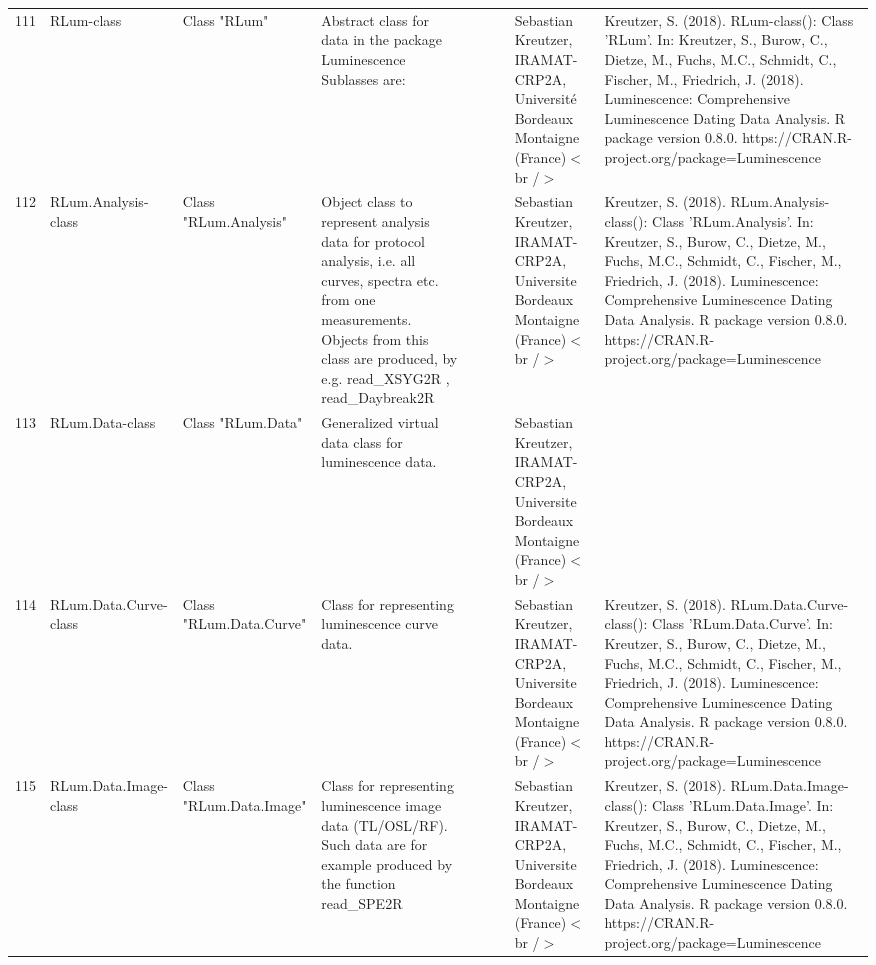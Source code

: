 \begin{table}[ht]
\begin{tabular}{rllllllll}
 \\ 
  111 & RLum-class & Class  "RLum" & Abstract class for data in the package Luminescence Sublasses are: &  &  &  & Sebastian Kreutzer, IRAMAT-CRP2A, Université Bordeaux Montaigne (France)$<$br /$>$ & Kreutzer, S. (2018). RLum-class(): Class 'RLum'. In: Kreutzer, S., Burow, C., Dietze, M., Fuchs, M.C., Schmidt, C., Fischer, M., Friedrich, J. (2018). Luminescence: Comprehensive Luminescence Dating Data Analysis. R package version 0.8.0. https://CRAN.R-project.org/package=Luminescence
 \\ 
  112 & RLum.Analysis-class & Class  "RLum.Analysis" & Object class to represent analysis data for protocol analysis, i.e. all curves, spectra etc. from one measurements. Objects from this class are produced, by e.g.  read\_XSYG2R ,  read\_Daybreak2R &  &  &  & Sebastian Kreutzer, IRAMAT-CRP2A, Universite Bordeaux Montaigne (France)$<$br /$>$ & Kreutzer, S. (2018). RLum.Analysis-class(): Class 'RLum.Analysis'. In: Kreutzer, S., Burow, C., Dietze, M., Fuchs, M.C., Schmidt, C., Fischer, M., Friedrich, J. (2018). Luminescence: Comprehensive Luminescence Dating Data Analysis. R package version 0.8.0. https://CRAN.R-project.org/package=Luminescence
 \\ 
  113 & RLum.Data-class & Class  "RLum.Data" & Generalized virtual data class for luminescence data. &  &  &  & Sebastian Kreutzer, IRAMAT-CRP2A, Universite Bordeaux Montaigne (France)$<$br /$>$ &  \\ 
  114 & RLum.Data.Curve-class & Class  "RLum.Data.Curve" & Class for representing luminescence curve data. &  &  &  & Sebastian Kreutzer, IRAMAT-CRP2A, Universite Bordeaux Montaigne (France)$<$br /$>$ & Kreutzer, S. (2018). RLum.Data.Curve-class(): Class 'RLum.Data.Curve'. In: Kreutzer, S., Burow, C., Dietze, M., Fuchs, M.C., Schmidt, C., Fischer, M., Friedrich, J. (2018). Luminescence: Comprehensive Luminescence Dating Data Analysis. R package version 0.8.0. https://CRAN.R-project.org/package=Luminescence
 \\ 
  115 & RLum.Data.Image-class & Class  "RLum.Data.Image" & Class for representing luminescence image data (TL/OSL/RF). Such data are for example produced by the function  read\_SPE2R &  &  &  & Sebastian Kreutzer, IRAMAT-CRP2A, Universite Bordeaux Montaigne (France)$<$br /$>$ & Kreutzer, S. (2018). RLum.Data.Image-class(): Class 'RLum.Data.Image'. In: Kreutzer, S., Burow, C., Dietze, M., Fuchs, M.C., Schmidt, C., Fischer, M., Friedrich, J. (2018). Luminescence: Comprehensive Luminescence Dating Data Analysis. R package version 0.8.0. https://CRAN.R-project.org/package=Luminescence

\end{tabular}
\end{table}
